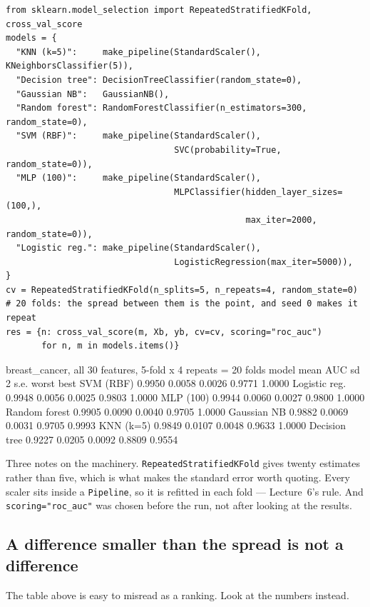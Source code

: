 \documentclass[11pt]{article}
\begin{document}
\begin{lstlisting}
from sklearn.model_selection import RepeatedStratifiedKFold, cross_val_score
models = {
  "KNN (k=5)":     make_pipeline(StandardScaler(), KNeighborsClassifier(5)),
  "Decision tree": DecisionTreeClassifier(random_state=0),
  "Gaussian NB":   GaussianNB(),
  "Random forest": RandomForestClassifier(n_estimators=300, random_state=0),
  "SVM (RBF)":     make_pipeline(StandardScaler(),
                                 SVC(probability=True, random_state=0)),
  "MLP (100)":     make_pipeline(StandardScaler(),
                                 MLPClassifier(hidden_layer_sizes=(100,),
                                               max_iter=2000, random_state=0)),
  "Logistic reg.": make_pipeline(StandardScaler(),
                                 LogisticRegression(max_iter=5000)),
}
cv = RepeatedStratifiedKFold(n_splits=5, n_repeats=4, random_state=0)
# 20 folds: the spread between them is the point, and seed 0 makes it repeat
res = {n: cross_val_score(m, Xb, yb, cv=cv, scoring="roc_auc")
       for n, m in models.items()}
\end{lstlisting}
\begin{codeout}
breast_cancer, all 30 features, 5-fold x 4 repeats = 20 folds
model             mean AUC     sd   2 s.e.    worst    best
SVM (RBF)         0.9950  0.0058  0.0026   0.9771  1.0000
Logistic reg.     0.9948  0.0056  0.0025   0.9803  1.0000
MLP (100)         0.9944  0.0060  0.0027   0.9800  1.0000
Random forest     0.9905  0.0090  0.0040   0.9705  1.0000
Gaussian NB       0.9882  0.0069  0.0031   0.9705  0.9993
KNN (k=5)         0.9849  0.0107  0.0048   0.9633  1.0000
Decision tree     0.9227  0.0205  0.0092   0.8809  0.9554
\end{codeout}

Three notes on the machinery. \texttt{RepeatedStratifiedKFold} gives twenty
estimates rather than five, which is what makes the standard error worth
quoting. Every scaler sits inside a \texttt{Pipeline}, so it is refitted in each
fold --- Lecture~6's rule. And \texttt{scoring="roc\_auc"} was chosen before the
run, not after looking at the results.

\subsection{A difference smaller than the spread is not a difference}

The table above is easy to misread as a ranking. Look at the numbers instead.
\end{document}
